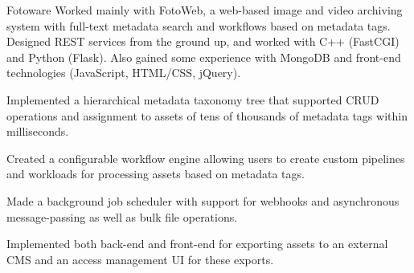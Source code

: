 \begin{experience}[last]{Fotoware}{
}
Worked mainly with FotoWeb, a web-based image and video
archiving system with full-text metadata search and workflows based on
metadata tags. %
Designed REST services from the ground up, and worked with C++ (FastCGI) and Python (Flask). %
Also gained some experience with MongoDB and front-end technologies (JavaScript, HTML/CSS, jQuery).

\begin{contribs}
	\item{Implemented a hierarchical metadata taxonomy tree that
		supported CRUD operations and assignment to assets of tens of thousands of metadata tags within
		milliseconds.}
	\item{Created a configurable workflow engine allowing users to
		create custom pipelines and workloads for processing assets based on
		metadata tags.}
	\item{Made a background job scheduler with support for
		webhooks and asynchronous message-passing as well as
		bulk file operations.}
	\item{Implemented both back-end and front-end for exporting
		assets to an external CMS and an access 
		management UI for these exports.}
\end{contribs}
\end{experience}


